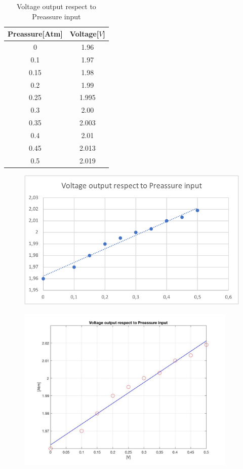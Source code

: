 \documentclass[12pt, a4papre]{article}
\begin{document}
	\begin{table}[H]
	\centering
	\begin{tabular}{||c c ||} 
	 \hline
		 Preassure[Atm] & Voltage[$V$] \\ [0.5ex] 
	 \hline\hline
	 	0 		& 1.96 \\
		 0.1 		& 1.97  \\ 
		 0.15 	& 1.98  \\ 
		 0.2 		&  1.99\\
		 0.25 	& 1.995  \\ 
		 0.3 		& 2.00 \\
		 0.35 	& 2.003  \\ 
		 0.4 		& 2.01 \\
		 0.45 	& 2.013  \\ 
		 0.5 		& 2.019 \\ [1ex] 
	 \hline
	\end{tabular}
	\caption{Voltage output respect to Preassure input}
	\end{table}
	
	
	\begin{figure}[H]
		\begin{center}
		\includegraphics{ExcelGraph2.png}
		\end{center}
	\end{figure}
	
	\begin{figure}[H]
		\begin{center}
		\includegraphics[width=105mm]{MatlabGraph1.jpg}
		\end{center}
	\end{figure}
	
\end{document}
